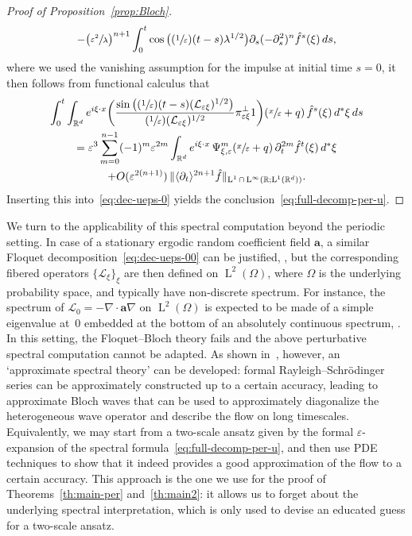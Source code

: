 \documentclass[JEP,XML,SOM,Unicode,published]{cedram}
\newcommand{\Psfrac}[2]{(\sfrac{#1}{#2})}
\theoremstyle{plain}
\theoremstyle{definition}
\numberwithin{equation}{section}
\newcommand{\e}{\varepsilon}
\newcommand{\Lc}{\mathcal{L}}
\newcommand{\R}{\mathbb R}
\newcommand{\Aa}{\boldsymbol a}
\newcommand{\Ld}{\operatorname{L}}
\begin{document}
\begin{proof}[Proof of Proposition~\ref{prop:Bloch}]
\begin{multline*}
-\big(\sfrac{\e^2}{\lambda}\big)^{n+1}\int_0^t\cos\big(\Psfrac1\e(t-s)\lambda^{1/2}\big)\partial_s(-\partial_s^2)^{n}\hat f^s(\xi)\,ds,
\end{multline*}
where we used the vanishing assumption for the impulse at initial time $s=0$,
it then follows from functional calculus that
\begin{multline*}
\int_0^t\int_{\R^d}e^{i\xi\cdot x} \bigg(\frac{\sin\big(\Psfrac1\e(t-s)(\Lc_{\e \xi})^{1/2}\big)}{\Psfrac1\e(\Lc_{\e \xi})^{1/2}}\pi_{\e\xi}^\bot1\bigg)(\sfrac x\e+q)\,\hat f^s(\xi)\,d^*\xi\,ds\\
=\e^3\sum_{{m}=0}^{n-1}(-1)^{m}\e^{2{m}}\int_{\R^d}e^{i\xi\cdot x}\,\Psi_{\xi,\e}^{{m}}(\sfrac x\e+q)\,\partial_t^{2{m}}\hat f^t(\xi)\,d^*\xi\\
+O(\e^{2(n+1)})\,\|\langle\partial_t\rangle^{2n+1}\hat f\|_{\Ld^1\cap\Ld^\infty(\R;\Ld^1(\R^d))}.
\end{multline*}
Inserting this into~\eqref{eq:dec-ueps-0} yields the conclusion~\eqref{eq:full-decomp-per-u}.
\end{proof}

We turn to the applicability of this spectral computation beyond the periodic setting.
In case of a stationary ergodic random coefficient field $\Aa$, a similar Floquet decomposition~\eqref{eq:dec-ueps-00} can be justified, \cf \cite{DGS,DS1}, but the corresponding fibered operators $\{\Lc_{\xi}\}_\xi$ are then defined on $\Ld^2(\Omega)$, where $\Omega$ is the underlying probability space, and typically have non-discrete spectrum. For instance, the spectrum of $\Lc_0=-\nabla\cdot\Aa\nabla$ on $\Ld^2(\Omega)$ is expected to be made of a simple eigenvalue at~$0$ embedded at the bottom of {an} absolutely continuous spectrum, \cf \cite{DS1}.
In this setting, the Floquet--Bloch theory fails and the above perturbative spectral computation cannot be adapted.
As shown in~\cite{BG,DGS}, however, an `approximate spectral theory' can be developed: formal Rayleigh--Schrödinger series can be approximately constructed up to a certain accuracy, leading to approximate Bloch waves that can be used to approximately diag\-o\-nalize the heterogeneous wave operator and describe the flow on long timescales.
Equivalently, we may start from a two-scale ansatz given by the formal $\e$-expansion of the spectral formula~\eqref{eq:full-decomp-per-u}, and then use PDE techniques to show that it indeed provides a good approximation of the flow to a certain accuracy. This approach is the one we use for the proof of Theorems~\ref{th:main-per} and~\ref{th:main2}: { it allows us to forget about the underlying spectral interpretation, which is only used to devise an educated guess for a two-scale ansatz.}
\end{document}
